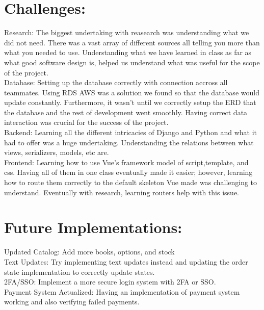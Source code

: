 \documentclass{article}
\begin{document}
	
	\newpage
	
	\section*{Challenges: }
	Research: The biggest undertaking with reasearch was understanding what we did not need. There was a vast array of different sources all telling you more than what you needed to use. Understanding what we have learned in class as far as what good software design is, helped us understand what was useful for the scope of the project. \\
	Database: Setting up the database correctly with connection accross all teammates. Using RDS AWS was a solution we found so that the database would update constantly. Furthermore, it wasn't until we correctly setup the ERD that the database and the rest of development went smoothly. Having correct data interaction was crucial for the success of the project.\\
	Backend: Learning all the different intricacies of Django and Python and what it had to offer was a huge undertaking. Understanding the relations between what views, serializers, models, etc are.  \\
	Frontend: Learning how to use Vue's framework model of script,template, and css. Having all of them in one class eventually made it easier; however, learning how to route them correctly to the default skeleton Vue made was challenging to understand. Eventually with research, learning routers help with this issue.  \\
	
	\section*{Future Implementations:}
	Updated Catalog: Add more books, options, and stock \\
	Text Updates: Try implementing text updates instead and updating the order state implementation to correctly update states. \\
	2FA/SSO: Implement a more secure login system with 2FA or SSO.\\
	Payment System Actualized: Having an implementation of payment system working and also verifying failed payments.\\
	
\end{document}
